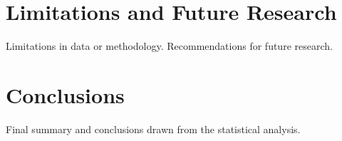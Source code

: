 \documentclass[12pt]{article}
\begin{document}
\section{Limitations and Future Research}

Limitations in data or methodology.
Recommendations for future research.

\section{Conclusions}

Final summary and conclusions drawn from the statistical analysis.


\newpage
%
%

 
\end{document}
